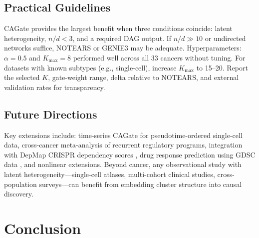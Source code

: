 \documentclass[12pt,a4paper]{article}
\begin{document}
\subsection{Practical Guidelines}









CAGate provides the largest benefit when three conditions coincide: latent heterogeneity, $n/d < 3$, and a required DAG output. If $n/d \gg 10$ or undirected networks suffice, NOTEARS or GENIE3 may be adequate. Hyperparameters: $\alpha=0.5$ and $K_{\max}=8$ performed well across all 33 cancers without tuning. For datasets with known subtypes (e.g., single-cell), increase $K_{\max}$ to 15--20. Report the selected $K$, gate-weight range, delta relative to NOTEARS, and external validation rates for transparency.









\subsection{Future Directions}









Key extensions include: time-series CAGate for pseudotime-ordered single-cell data, cross-cancer meta-analysis of recurrent regulatory programs, integration with DepMap CRISPR dependency scores \cite{Tsherniak2017}, drug response prediction using GDSC data \cite{Iorio2016}, and nonlinear extensions. Beyond cancer, any observational study with latent heterogeneity---single-cell atlases, multi-cohort clinical studies, cross-population surveys---can benefit from embedding cluster structure into causal discovery.













\section{Conclusion}
\end{document}
